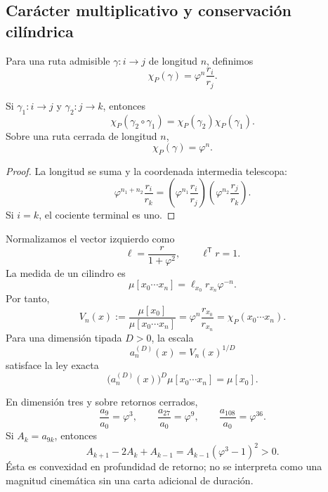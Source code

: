 \subsection{Carácter multiplicativo y conservación cilíndrica}

Para una ruta admisible \(\gamma:i\to j\) de longitud \(n\), definimos
\begin{equation}
 \chi_P(\gamma)=\varphi^n\frac{r_i}{r_j}.
 \label{p12-83-c9-s3:eq:caracter-parry-phi}
\end{equation}

\begin{proposition}
\label{p12-83-c9-s3:prop:multiplicatividad-parry-phi}
Si \(\gamma_1:i\to j\) y \(\gamma_2:j\to k\), entonces
\[
 \chi_P(\gamma_2\circ\gamma_1)
 =\chi_P(\gamma_2)\chi_P(\gamma_1).
\]
Sobre una ruta cerrada de longitud \(n\),
\[
 \chi_P(\gamma)=\varphi^n.
\]
\end{proposition}

\begin{proof}
La longitud se suma y la coordenada intermedia telescopa:
\[
 \varphi^{n_1+n_2}\frac{r_i}{r_k}
 =\left(\varphi^{n_1}\frac{r_i}{r_j}\right)
  \left(\varphi^{n_2}\frac{r_j}{r_k}\right).
\]
Si \(i=k\), el cociente terminal es uno.
\end{proof}

Normalizamos el vector izquierdo como
\[
 \ell=\frac{r}{1+\varphi^2},
 \qquad
 \ell^{\mathsf T}r=1.
\]
La medida de un cilindro es
\[
 \mu[x_0\cdots x_n]
 =\ell_{x_0}r_{x_n}\varphi^{-n}.
\]
Por tanto,
\begin{equation}
 V_n(x)
 :=\frac{\mu[x_0]}{\mu[x_0\cdots x_n]}
 =\varphi^n\frac{r_{x_0}}{r_{x_n}}
 =\chi_P(x_0\cdots x_n).
 \label{p12-83-c9-s3:eq:volumen-cilindrico-phi}
\end{equation}
Para una dimensión tipada \(D>0\), la escala
\[
 a_n^{(D)}(x)=V_n(x)^{1/D}
\]
satisface la ley exacta
\begin{equation}
 \boxed{
 \bigl(a_n^{(D)}(x)\bigr)^D
 \mu[x_0\cdots x_n]=\mu[x_0].}
 \label{p12-83-c9-s3:eq:conservacion-cilindrica-phi}
\end{equation}

En dimensión tres y sobre retornos cerrados,
\[
 \frac{a_9}{a_0}=\varphi^3,
 \qquad
 \frac{a_{27}}{a_0}=\varphi^9,
 \qquad
 \frac{a_{108}}{a_0}=\varphi^{36}.
\]
Si \(A_k=a_{9k}\), entonces
\begin{equation}
 A_{k+1}-2A_k+A_{k-1}
 =A_{k-1}(\varphi^3-1)^2>0.
 \label{p12-83-c9-s3:eq:convexidad-retornos-phi}
\end{equation}
Ésta es convexidad en profundidad de retorno; no se interpreta como una
magnitud cinemática sin una carta adicional de duración.

